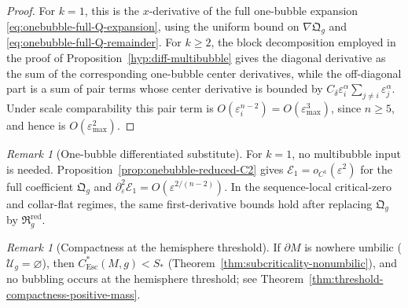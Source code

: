 \documentclass[11pt,reqno,a4paper]{amsart}
\numberwithin{equation}{section}
\theoremstyle{plain}
\newcommand{\Esc}{\ensuremath{\mathrm{Esc}}}
\theoremstyle{remark}
\newtheorem{remark}[theorem]{Remark}
\theoremstyle{plain}
\begin{document}
\begin{proof}
For $k=1$, this is the $x$-derivative of the full one-bubble expansion
\eqref{eq:onebubble-full-Q-expansion}, using the uniform bound on $\nabla\mathfrak Q_g$ and
\eqref{eq:onebubble-full-Q-remainder}.  For $k\ge2$, the block decomposition employed in the proof of
Proposition~\ref{hyp:diff-multibubble} gives the diagonal derivative as the sum of the corresponding one-bubble
center derivatives, while the off-diagonal part is a sum of pair terms whose center derivative is bounded by
$C_\delta\varepsilon_i^\alpha\sum_{j\ne i}\varepsilon_j^\alpha$.  Under scale comparability this pair term is
$O(\varepsilon_i^{n-2})=O(\varepsilon_{\max}^3)$, since $n\ge5$, and hence is $O(\varepsilon_{\max}^2)$.
\end{proof}


\begin{remark}[One-bubble differentiated substitute]\label{rem:diff-multibubble-k1}
For $k=1$, no multibubble input is needed.  Proposition~\ref{prop:onebubble-reduced-C2} gives
$\mathcal E_1=o_{C^1}(\varepsilon^2)$ for the full coefficient $\mathfrak Q_g$ and
$\partial_\varepsilon^2\mathcal E_1=O(\varepsilon^{2/(n-2)})$.
In the sequence-local critical-zero and collar-flat regimes, the same first-derivative bounds hold after
replacing $\mathfrak Q_g$ by $\mathfrak R_g^{\mathrm{red}}$.
\end{remark}



\begin{remark}[Compactness at the hemisphere threshold]\label{thm:no-tower-positive-mass}
If $\partial M$ is nowhere umbilic ($\mathcal U_g=\varnothing$),
then $C^*_{\Esc}(M,g)<S_\ast$
(Theorem~\ref{thm:subcriticality-nonumbilic}),
and no bubbling occurs
at the hemisphere threshold; see Theorem~\ref{thm:threshold-compactness-positive-mass}.
\end{remark}
\end{document}
